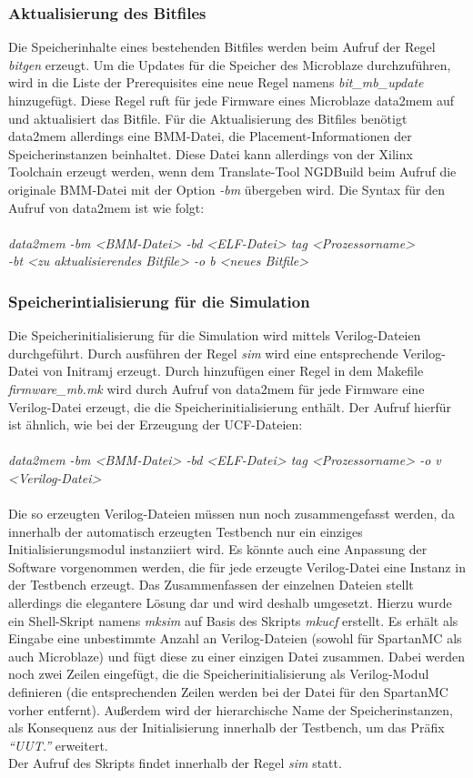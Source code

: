 \subsubsection{Aktualisierung des Bitfiles}
Die Speicherinhalte eines bestehenden Bitfiles werden beim Aufruf der Regel \textit{bitgen} erzeugt. Um die Updates für die Speicher des Microblaze durchzuführen, wird in die Liste der Prerequisites eine neue Regel namens \textit{bit\_mb\_update} hinzugefügt. Diese Regel ruft für jede Firmware eines Microblaze data2mem auf und aktualisiert das Bitfile. Für die Aktualisierung des Bitfiles benötigt data2mem allerdings eine BMM-Datei, die Placement-Informationen der Speicherinstanzen beinhaltet. Diese Datei kann allerdings von der Xilinx Toolchain erzeugt werden, wenn dem Translate-Tool NGDBuild beim Aufruf die originale BMM-Datei mit der Option \textit{-bm} übergeben wird. Die Syntax für den Aufruf von data2mem ist wie folgt:\\\\
\indent
\textit{data2mem -bm <BMM-Datei> -bd <ELF-Datei> tag <Prozessorname>\\
\indent \indent \indent -bt <zu aktualisierendes Bitfile> -o b <neues Bitfile>}
\subsubsection{Speicherintialisierung für die Simulation}
Die Speicherinitialisierung für die Simulation wird mittels Verilog-Dateien durchgeführt. Durch ausführen der Regel \textit{sim} wird eine entsprechende Verilog-Datei von Initramj erzeugt. Durch hinzufügen einer Regel in dem Makefile \textit{firmware\_mb.mk} wird durch Aufruf von data2mem für jede Firmware eine Verilog-Datei erzeugt, die die Speicherinitialisierung enthält. Der Aufruf hierfür ist ähnlich, wie bei der Erzeugung der UCF-Dateien:\\\\
\indent
\textit{data2mem -bm <BMM-Datei> -bd <ELF-Datei> tag <Prozessorname> -o v <Verilog-Datei>}\\\\
Die so erzeugten Verilog-Dateien müssen nun noch zusammengefasst werden, da innerhalb der automatisch erzeugten Testbench nur ein einziges Initialisierungsmodul instanziiert wird. Es könnte auch eine Anpassung der Software vorgenommen werden, die für jede erzeugte Verilog-Datei eine Instanz in der Testbench erzeugt. Das Zusammenfassen der einzelnen Dateien stellt allerdings die elegantere Lösung dar und wird deshalb umgesetzt. Hierzu wurde ein Shell-Skript namens \textit{mksim} auf Basis des Skripts \textit{mkucf} erstellt. Es erhält als Eingabe eine unbestimmte Anzahl an Verilog-Dateien (sowohl für SpartanMC als auch Microblaze) und fügt diese zu einer einzigen Datei zusammen. Dabei werden noch zwei Zeilen eingefügt, die die Speicherinitialisierung als Verilog-Modul definieren (die entsprechenden Zeilen werden bei der Datei für den SpartanMC vorher entfernt). Außerdem wird der hierarchische Name der Speicherinstanzen, als Konsequenz aus der Initialisierung innerhalb der Testbench, um das Präfix \textit{``UUT.''} erweitert.\\
Der Aufruf des Skripts findet innerhalb der Regel \textit{sim} statt.

